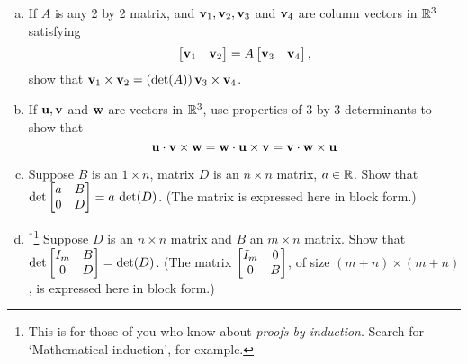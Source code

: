 \begin{prob}
\begin{enumerate}[a)]
\end{enumerate}
\end{prob} \begin{prob} \label{prob21.5}
\medskip
\begin{enumerate}[a)]
\item 
\medskip If $A$ is any 2 by  2 matrix, and $\mathbf{v}_1, \mathbf{v}_2, \mathbf{v}_3$ and $\mathbf{v}_4$ are column vectors in $\mathbb{R}^3$ satisfying $$\bmatrix \vv_1 &\vv_2 \endbmatrix= A  \bmatrix \vv_3 &\vv_4 \endbmatrix,$$show that $\mathbf{v}_1\times \mathbf{v}_2 =(\det(A))\, \mathbf{v}_3\times \mathbf{v}_4$.
\medskip
%
\item\sov If   $\mathbf{u}, \mathbf{v}$ and $\mathbf{w}$ are  vectors in $\mathbb{R}^3$, use properties of 3 by 3 determinants to show that $$ \mathbf{u}\cdot \mathbf{v}\times \mathbf{w}=  \mathbf{w}\cdot \mathbf{u}\times \mathbf{v}= \mathbf{v}\cdot \mathbf{w}\times \mathbf{u}$$


\item Suppose $B$ is an $1\times n$,  matrix $D$ is an $n\times n$  matrix, $a\in \mathbb{R}$. Show that $\det \bmatrix a&B\\0&D\endbmatrix= a\,\det(D)$. (The matrix is  expressed here in block form.)
\medskip
%
\item$^\ast$\footnote{This is for those of you who know about {\it proofs by induction}.    Search for `Mathematical induction', for example.} Suppose $D$ is an $n\times n$  matrix and $B$ an $m\times n$ matrix. Show that $\det \bmatrix I_m&B\\0&D\endbmatrix= \det(D)$. (The matrix $\bmatrix I_m&0\\0&B\endbmatrix$,  of size $(m+n)\times (m+n)$, is expressed here in block form.)
\medskip
%


\end{enumerate}
\end{prob}
